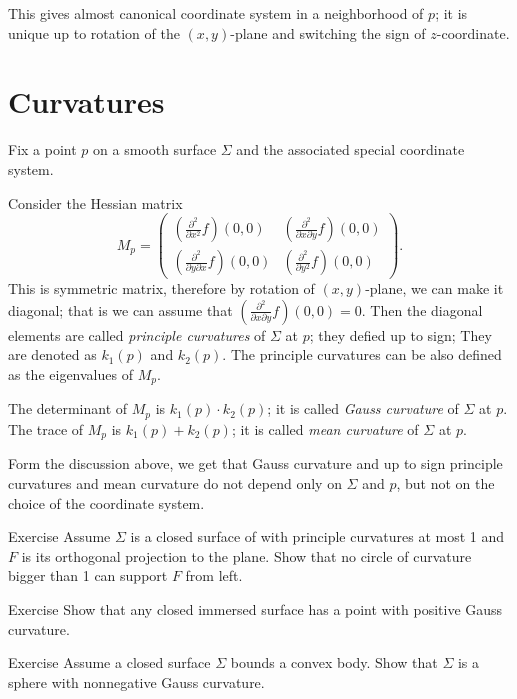 This gives almost canonical coordinate system in a neighborhood of $p$;
it is unique up to rotation of  the $(x,y)$-plane and switching the sign of $z$-coordinate.

\section{Curvatures}

Fix a point $p$ on a smooth surface $\Sigma$ and the associated special coordinate system. 

Consider the Hessian matrix 
\[M_p=\begin{pmatrix}
   (\tfrac{\partial^2}{\partial x^2}f)(0,0)
   &(\tfrac{\partial^2}{\partial x\partial y}f)(0,0)
   \\
   (\tfrac{\partial^2}{\partial y\partial x}f)(0,0)
   &(\tfrac{\partial^2}{\partial y^2}f)(0,0)
  \end{pmatrix}.
\]
This is symmetric matrix, therefore by rotation of $(x,y)$-plane, we can make it diagonal;
that is we can assume that $(\tfrac{\partial^2}{\partial x\partial y}f)(0,0)=0$.
Then the diagonal elements are called \emph{principle curvatures} of $\Sigma$ at $p$;
they defied up to sign;
They are denoted as $k_1(p)$ and $k_2(p)$.
The principle curvatures can be also defined as the eigenvalues of $M_p$.

The determinant of $M_p$ is $k_1(p)\cdot k_2(p)$;
it is called \emph{Gauss curvature} of $\Sigma$ at $p$.
The trace of $M_p$ is $k_1(p)+ k_2(p)$;
it is called \emph{mean curvature} of $\Sigma$ at $p$.

Form the discussion above, 
we get that Gauss curvature and up to sign principle curvatures and mean curvature 
do not depend only on $\Sigma$ and $p$,
but not on the choice of the coordinate system.

\begin{thm}{Exercise}\label{ex:projection}
Assume $\Sigma$ is a closed surface of with principle curvatures at most 1
and $F$ is its orthogonal projection to the plane.
Show that no circle of curvature bigger than 1 can support $F$ from left. 
\end{thm}

\begin{thm}{Exercise}
Show that any closed immersed surface has a point with positive Gauss curvature.
\end{thm}

\begin{thm}{Exercise}
Assume a closed surface $\Sigma$ bounds a convex body.
Show that $\Sigma$ is a sphere with nonnegative Gauss curvature. 
\end{thm}












